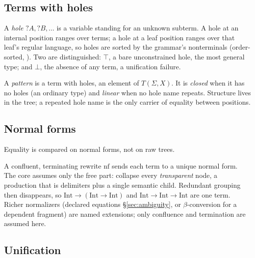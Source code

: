 \subsection{Terms with holes}
\label{sec:patterns}

\begin{definition}[Hole]
  \label{def:hole}
  A \emph{hole} $?A, ?B, \dots$ is a variable standing for an unknown subterm. A
  hole at an internal position ranges over terms; a hole at a leaf position
  ranges over that leaf's regular language, so holes are sorted by the grammar's
  nonterminals (order-sorted, \cite{baader2001unification}). Two are
  distinguished: $\top$, a bare unconstrained hole, the most general type; and
  $\bot$, the absence of any term, a unification failure.
\end{definition}

\begin{definition}[Pattern]
  \label{def:pattern}
  A \emph{pattern} is a term with holes, an element of $T(\Sigma, X)$. It is
  \emph{closed} when it has no holes (an ordinary type) and \emph{linear} when no
  hole name repeats. Structure lives in the tree; a repeated hole name is the
  only carrier of equality between positions.
\end{definition}

\subsection{Normal forms}

Equality is compared on normal forms, not on raw trees.

\begin{definition}
  \label{def:normal-form}
  A confluent, terminating rewrite $\mathrm{nf}$ sends each term to a unique
  normal form. The core assumes only the free part: collapse every
  \emph{transparent} node, a production that is delimiters plus a single
  semantic child. Redundant grouping then disappears, so $\mathrm{Int} \to
  (\mathrm{Int} \to \mathrm{Int})$ and $\mathrm{Int} \to \mathrm{Int} \to
  \mathrm{Int}$ are one term. Richer normalizers (declared equations
  \S\ref{sec:ambiguity}, or $\beta$-conversion for a dependent fragment) are
  named extensions; only confluence and termination are assumed here.
\end{definition}

\subsection{Unification}
\label{sec:unify}

